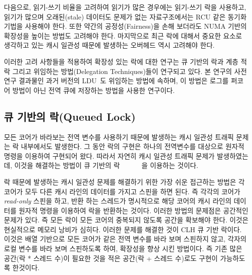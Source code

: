 다음으로, 읽기-쓰기 비율을 고려하여 읽기가 많은 경우에는 읽기-쓰기 락을 사용하고,
읽기가 많으며 오래된(stale) 데이터도 문제가 없는 자료구조에서는 RCU 같은 동기화 기법을 사용해야 한다.  
또한 약간의 공정성(Fairness)을 손해 보더라도 NUMA 기반의 확장성을 높이는 방법도 고려해야 한다.
마지막으로 최근 락에 대해서 중요한 요소로 생각하고 있는 캐시 일관성 때문에 발생하는 
오버헤드 역시 고려해야 한다. 


%


이러한 고려 사항들을 적용하여 확장성 있는 락에 대한 연구는 큐 기반의
락과 계층 적 락 그리고 위임하는 방법(Delegation Techniques)들이 연구되고 있다. 
본 연구의 사전 연구 결과물인 과거 버전의 LDU~\cite{Kyong2016LDU}도 위임하는 방법에 속하며, 
이 방법은 로그를 퍼코어 방법이 아닌 전역 큐에 저장하는 방법을 사용한 연구이다.

\subsection{큐 기반의 락(Queued Lock)}
모든 코어가 바라보는 전역 변수를 사용하기 때문에 발생하는 캐시 일관성 트래픽 문제는 
락 내부에서도 발생한다. 
그 동안 락의 구현은 하나의 전역변수를 대상으로 원자적 명령을 이용하여 구현되어 왔다.
따라서 자연히 캐시 일관성 트래픽 문제가 발생하였는데, 이것을 해결하는 방법이 큐 기반의 락
~\cite{MellorCrummey1991MCS}~\cite{Magnusson1994QLC}~\cite{Wang2016BeMyGuest}~\cite{Scott2013SS}
~\cite{Bueso2014MCS}을 이용하는 것이다. 

락 때문에 발생하는 캐시 일관성 문제를 해결하기 위한 가장 쉬운 접근하는 방법은 각 
코어가 모두 다른 캐시 라인의 데이터를 가지고 스핀을 하면 된다.
즉 각각의 코어가 \textit{read-only} 스핀을 하고, 반환 하는 스레드가 명시적으로 해당 코어의 캐시 라인의 데이터를 
원자적 명령을 이용하여 락을 반환하는 것이다. 
이러한 방법의 문제점은 공간적인 문제가 있다. 
즉 모든 락이 모든 코어의 중복되지 않도록 공간을 확보해야 한다.
이것은 현실적으로 메모리 낭비가 심히다.
이러한 문제를 해결한 것이 CLH 큐 기반 락이다. 
이것은 배열 기반으로 모든 코어가 같은 전역 변수를 바라 보며 스핀하지 않고, 
각자의 로컬 변수를 바라 보며 스핀하도록 하여, 확장성을 향상 시킨 방법이다. 
즉 기존 많은 공간(락 * 스레드 수)이 필요한 것을 적은 공간(락 + 스레드 수)로도 구현이 가능하도록 한것이다.

